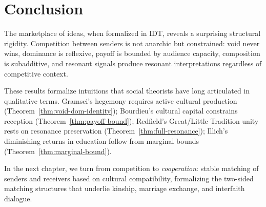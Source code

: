\section{Conclusion}
\label{sec:ch11-conclusion}

The marketplace of ideas, when formalized in IDT, reveals a surprising
structural rigidity.  Competition between senders is not anarchic but
constrained: void never wins, dominance is reflexive, payoff is bounded by
audience capacity, composition is subadditive, and resonant signals produce
resonant interpretations regardless of competitive context.

These results formalize intuitions that social theorists have long articulated
in qualitative terms.  Gramsci's hegemony requires active cultural production
(Theorem~\ref{thm:void-dom-identity}); Bourdieu's cultural capital constrains
reception (Theorem~\ref{thm:payoff-bound}); Redfield's Great/Little Tradition
unity rests on resonance preservation (Theorem~\ref{thm:full-resonance});
Illich's diminishing returns in education follow from marginal bounds
(Theorem~\ref{thm:marginal-bound}).

In the next chapter, we turn from competition to \emph{cooperation}: stable
matching of senders and receivers based on cultural compatibility, formalizing
the two-sided matching structures that underlie kinship, marriage exchange,
and interfaith dialogue.
